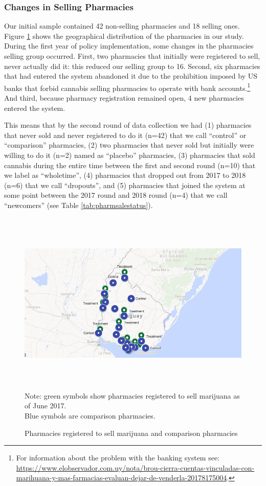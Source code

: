 \documentclass[11pt]{article}
\begin{document}
\subsubsection{Changes in Selling Pharmacies}
Our initial sample contained 42 non-selling pharmacies and 18 selling ones. Figure \ref{fig:ctrltrtpharms_1} shows the geographical distribution of the pharmacies in our study. During the first year of policy implementation, some changes in the pharmacies selling group occurred. First, two pharmacies that initially were registered to sell, never actually did it: this reduced our selling group to 16. Second, six pharmacies that had entered the system abandoned it due to the prohibition imposed by US banks that forbid cannabis selling pharmacies to operate with bank accounts.\footnote{For information about the problem with the banking system see: \url{https://www.elobservador.com.uy/nota/brou-cierra-cuentas-vinculadas-con-marihuana-y-mas-farmacias-evaluan-dejar-de-venderla-20178175004}.} And third, because pharmacy registration remained open, 4 new pharmacies entered the system.

This means that by the second round of data collection we had (1) pharmacies that never sold and never registered to do it (n=42) that we call ``control'' or ``comparison'' pharmacies, (2) two pharmacies that never sold but initially were willing to do it (n=2) named as ``placebo'' pharmacies, (3)  pharmacies that sold cannabis during the entire time between the first and second round (n=10) that we label as ``wholetime'', (4) pharmacies that dropped out from 2017 to 2018 (n=6) that we call ``dropouts'', and (5) pharmacies that joined the system at some point between the 2017 round and 2018 round (n=4) that we call ``newcomers'' (see Table \ref{tab:pharmsalestatus}).

\begin{figure}[htpb!]
    \centering
    \label{fig:ctrltrtpharms_1}
    \caption{Pharmacies registered to sell marijuana and comparison pharmacies}
    \includegraphics[width=6.5in,height=3.4851in]{./media/country.png}
\footnotesize{Note: green symbols show pharmacies registered to sell marijuana as of June 2017. \\ Blue symbols are comparison pharmacies.}
\end{figure}
\end{document}
